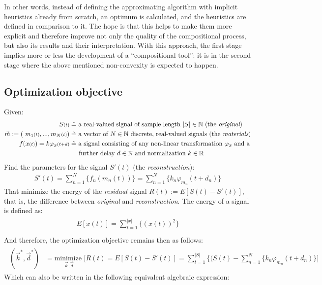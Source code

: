\documentclass[11pt]{scrartcl} %
\begin{document}
In other words, instead of defining the approximating algorithm with implicit heuristics already from scratch, an optimum is calculated, and the heuristics are defined in comparison to it. The hope is that this helps to make them more explicit and therefore improve not only the quality of the compositional process, but also its results and their interpretation. With this approach, the first stage implies more or less the development of a ``compositional tool'': it is in the second stage where the above mentioned non-convexity is expected to happen.
\subsection*{Optimization objective}
Given:
\begin{align*}
    \begin{aligned}
      S{\scriptstyle (t)} \;&\hat{=} \text{ a real-valued signal of sample length } |S| \in \mathbb{N} \text{ (the {\it original})}\\
      \vec{m} := (\ m_1{\scriptstyle (t)}, ..., m_N{\scriptstyle (t)}) \;&\hat{=} \text{ a vector of \(N\in\mathbb{N}\) discrete, real-valued signals (the {\it materials})}\\
      f(x{\scriptstyle (t)}) = k
      \varphi_x{\scriptstyle (t+d)} \;&\hat{=} \text{ a signal consisting of any non-linear transformation } \varphi_x \text{ and a}\\
        &\phantom{\quad\,}\text{further delay } d\in\mathbb{N} \text{ and normalization } k\in\mathbb{R} \notag\\ %
    \end{aligned}
\end{align*}
Find the parameters for the signal \(S'{\scriptstyle (t)}\) (the {\it reconstruction}):
  \begin{align*}
    S'{\scriptstyle (t)} = \sum_{n=1}^N\{f_n(m_n{\scriptstyle (t)})\} = \sum_{n=1}^N\{k_n\varphi_{m_n}{\scriptstyle (t+d_n)}\}
  \end{align*}
  That minimize the energy of the {\it residual} signal \(R{\scriptstyle (t)} := E[S{\scriptstyle (t)}-S'{\scriptstyle (t)}]\), that is, the difference between  {\it original} and {\it reconstruction}. The energy of a signal is defined as:
  \begin{align*}
    \begin{aligned}
      E[x{\scriptstyle (t)}] = \sum_{t=1}^{|x|}\{(x{\scriptstyle (t)})^2\}\\[15pt]
    \end{aligned}
  \end{align*}
  And therefore, the optimization objective remains then as follows:
  \begin{align*}
    \begin{aligned}
      (\vec{k}^*, \vec{d}^*) &= \underset{\vec{k}, \vec{d}}{\text{minimize }}\Bigg[
      R{\scriptstyle (t)} = E[S{\scriptstyle (t)}-S'{\scriptstyle (t)}]
      = \sum_{t=1}^{|S|}\bigg\{\Big(S{\scriptstyle (t)}-\sum_{n=1}^N\{k_n\varphi_{m_n}{\scriptstyle (t+d_n)}\}\Bigg]
    \end{aligned}
  \end{align*}
  Which can also be written in the following equivalent algebraic expression:
  
\end{document}
